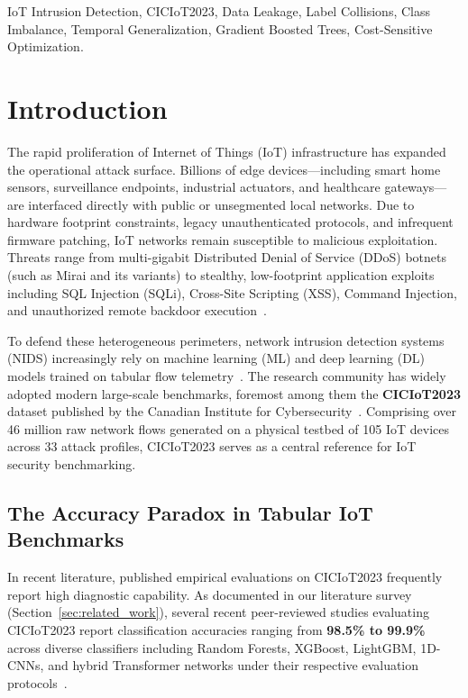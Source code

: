 \documentclass[conference,10pt,twocolumn]{IEEEtran}
\begin{document}
\begin{IEEEkeywords}
IoT Intrusion Detection, CICIoT2023, Data Leakage, Label Collisions, Class Imbalance, Temporal Generalization, Gradient Boosted Trees, Cost-Sensitive Optimization.
\end{IEEEkeywords}

\section{Introduction}

The rapid proliferation of Internet of Things (IoT) infrastructure has expanded the operational attack surface. Billions of edge devices---including smart home sensors, surveillance endpoints, industrial actuators, and healthcare gateways---are interfaced directly with public or unsegmented local networks. Due to hardware footprint constraints, legacy unauthenticated protocols, and infrequent firmware patching, IoT networks remain susceptible to malicious exploitation. Threats range from multi-gigabit Distributed Denial of Service (DDoS) botnets (such as Mirai and its variants) to stealthy, low-footprint application exploits including SQL Injection (SQLi), Cross-Site Scripting (XSS), Command Injection, and unauthorized remote backdoor execution~\cite{neto2023ciciot, ahmad2021network}.

To defend these heterogeneous perimeters, network intrusion detection systems (NIDS) increasingly rely on machine learning (ML) and deep learning (DL) models trained on tabular flow telemetry~\cite{mishra2019detailed}. The research community has widely adopted modern large-scale benchmarks, foremost among them the \textbf{CICIoT2023} dataset published by the Canadian Institute for Cybersecurity~\cite{neto2023ciciot}. Comprising over 46 million raw network flows generated on a physical testbed of 105 IoT devices across 33 attack profiles, CICIoT2023 serves as a central reference for IoT security benchmarking.

\subsection{The Accuracy Paradox in Tabular IoT Benchmarks}
In recent literature, published empirical evaluations on CICIoT2023 frequently report high diagnostic capability. As documented in our literature survey (Section~\ref{sec:related_work}), several recent peer-reviewed studies evaluating CICIoT2023 report classification accuracies ranging from \textbf{98.5\% to 99.9\%} across diverse classifiers including Random Forests, XGBoost, LightGBM, 1D-CNNs, and hybrid Transformer networks under their respective evaluation protocols~\cite{neto2023ciciot, khan2026resource, almahaqeri2026optimized, ullah2026comparative, abdelrahman2026feature}.
\end{document}
